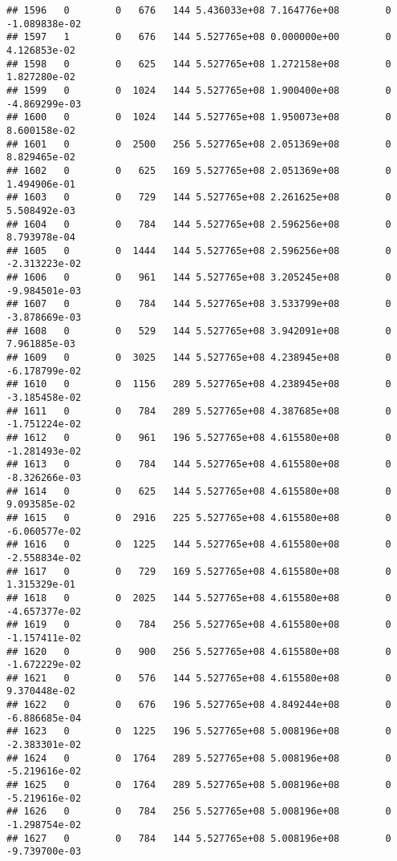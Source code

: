 \documentclass[
]{article}
\begin{document}
\begin{enumerate}
\begin{verbatim}
## 1596   0        0   676   144 5.436033e+08 7.164776e+08        0 -1.089838e-02
## 1597   1        0   676   144 5.527765e+08 0.000000e+00        0  4.126853e-02
## 1598   0        0   625   144 5.527765e+08 1.272158e+08        0  1.827280e-02
## 1599   0        0  1024   144 5.527765e+08 1.900400e+08        0 -4.869299e-03
## 1600   0        0  1024   144 5.527765e+08 1.950073e+08        0  8.600158e-02
## 1601   0        0  2500   256 5.527765e+08 2.051369e+08        0  8.829465e-02
## 1602   0        0   625   169 5.527765e+08 2.051369e+08        0  1.494906e-01
## 1603   0        0   729   144 5.527765e+08 2.261625e+08        0  5.508492e-03
## 1604   0        0   784   144 5.527765e+08 2.596256e+08        0  8.793978e-04
## 1605   0        0  1444   144 5.527765e+08 2.596256e+08        0 -2.313223e-02
## 1606   0        0   961   144 5.527765e+08 3.205245e+08        0 -9.984501e-03
## 1607   0        0   784   144 5.527765e+08 3.533799e+08        0 -3.878669e-03
## 1608   0        0   529   144 5.527765e+08 3.942091e+08        0  7.961885e-03
## 1609   0        0  3025   144 5.527765e+08 4.238945e+08        0 -6.178799e-02
## 1610   0        0  1156   289 5.527765e+08 4.238945e+08        0 -3.185458e-02
## 1611   0        0   784   289 5.527765e+08 4.387685e+08        0 -1.751224e-02
## 1612   0        0   961   196 5.527765e+08 4.615580e+08        0 -1.281493e-02
## 1613   0        0   784   144 5.527765e+08 4.615580e+08        0 -8.326266e-03
## 1614   0        0   625   144 5.527765e+08 4.615580e+08        0  9.093585e-02
## 1615   0        0  2916   225 5.527765e+08 4.615580e+08        0 -6.060577e-02
## 1616   0        0  1225   144 5.527765e+08 4.615580e+08        0 -2.558834e-02
## 1617   0        0   729   169 5.527765e+08 4.615580e+08        0  1.315329e-01
## 1618   0        0  2025   144 5.527765e+08 4.615580e+08        0 -4.657377e-02
## 1619   0        0   784   256 5.527765e+08 4.615580e+08        0 -1.157411e-02
## 1620   0        0   900   256 5.527765e+08 4.615580e+08        0 -1.672229e-02
## 1621   0        0   576   144 5.527765e+08 4.615580e+08        0  9.370448e-02
## 1622   0        0   676   196 5.527765e+08 4.849244e+08        0 -6.886685e-04
## 1623   0        0  1225   196 5.527765e+08 5.008196e+08        0 -2.383301e-02
## 1624   0        0  1764   289 5.527765e+08 5.008196e+08        0 -5.219616e-02
## 1625   0        0  1764   289 5.527765e+08 5.008196e+08        0 -5.219616e-02
## 1626   0        0   784   256 5.527765e+08 5.008196e+08        0 -1.298754e-02
## 1627   0        0   784   144 5.527765e+08 5.008196e+08        0 -9.739700e-03

\end{verbatim}
\end{enumerate}
\end{document}
